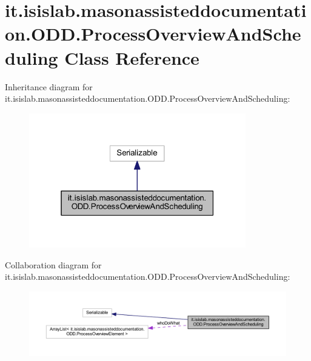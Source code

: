 \hypertarget{classit_1_1isislab_1_1masonassisteddocumentation_1_1_o_d_d_1_1_process_overview_and_scheduling}{\section{it.\-isislab.\-masonassisteddocumentation.\-O\-D\-D.\-Process\-Overview\-And\-Scheduling Class Reference}
\label{classit_1_1isislab_1_1masonassisteddocumentation_1_1_o_d_d_1_1_process_overview_and_scheduling}
}


Inheritance diagram for it.\-isislab.\-masonassisteddocumentation.\-O\-D\-D.\-Process\-Overview\-And\-Scheduling\-:
\nopagebreak
\begin{figure}[H]
\begin{center}
\leavevmode
\includegraphics[width=268pt]{classit_1_1isislab_1_1masonassisteddocumentation_1_1_o_d_d_1_1_process_overview_and_scheduling__inherit__graph}
\end{center}
\end{figure}


Collaboration diagram for it.\-isislab.\-masonassisteddocumentation.\-O\-D\-D.\-Process\-Overview\-And\-Scheduling\-:
\nopagebreak
\begin{figure}[H]
\begin{center}
\leavevmode
\includegraphics[width=350pt]{classit_1_1isislab_1_1masonassisteddocumentation_1_1_o_d_d_1_1_process_overview_and_scheduling__coll__graph}
\end{center}
\end{figure}
